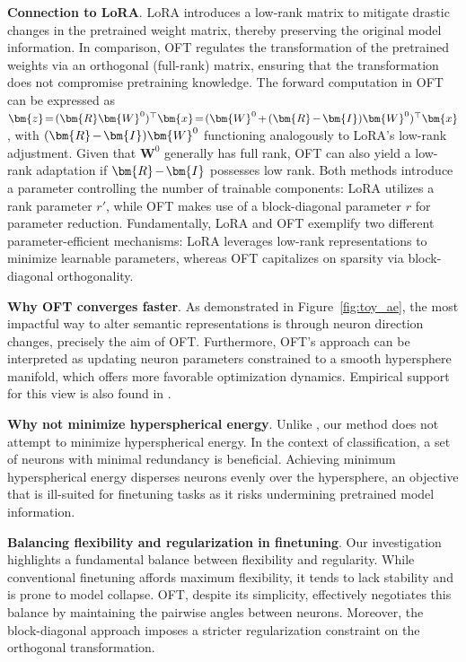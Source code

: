 \textbf{Connection to LoRA}. LoRA introduces a low-rank matrix to mitigate drastic changes in the pretrained weight matrix, thereby preserving the original model information. In comparison, OFT regulates the transformation of the pretrained weights via an orthogonal (full-rank) matrix, ensuring that the transformation does not compromise pretraining knowledge. The forward computation in OFT can be expressed as $\thickmuskip=2mu \medmuskip=2mu \bm{z}=(\bm{R}\bm{W}^0)^\top\bm{x}=(\bm{W}^0+(\bm{R}-\bm{I})\bm{W}^0)^\top\bm{x}$, with $\thickmuskip=2mu \medmuskip=2mu (\bm{R}-\bm{I})\bm{W}^0$ functioning analogously to LoRA’s low-rank adjustment. Given that $\bm{W}^0$ generally has full rank, OFT can also yield a low-rank adaptation if $\thickmuskip=2mu \medmuskip=2mu \bm{R}-\bm{I}$ possesses low rank. Both methods introduce a parameter controlling the number of trainable components: LoRA utilizes a rank parameter $r'$, while OFT makes use of a block-diagonal parameter $r$ for parameter reduction. Fundamentally, LoRA and OFT exemplify two different parameter-efficient mechanisms: LoRA leverages low-rank representations to minimize learnable parameters, whereas OFT capitalizes on sparsity via block-diagonal orthogonality.

\textbf{Why OFT converges faster}. As demonstrated in Figure~\ref{fig:toy_ae}, the most impactful way to alter semantic representations is through neuron direction changes, precisely the aim of OFT. Furthermore, OFT's approach can be interpreted as updating neuron parameters constrained to a smooth hypersphere manifold, which offers more favorable optimization dynamics. Empirical support for this view is also found in \cite{liu2021orthogonal}.

\textbf{Why not minimize hyperspherical energy}. Unlike \cite{liu2021orthogonal}, our method does not attempt to minimize hyperspherical energy. In the context of classification, a set of neurons with minimal redundancy is beneficial. Achieving minimum hyperspherical energy disperses neurons evenly over the hypersphere, an objective that is ill-suited for finetuning tasks as it risks undermining pretrained model information.

\textbf{Balancing flexibility and regularization in finetuning}. Our investigation highlights a fundamental balance between flexibility and regularity. While conventional finetuning affords maximum flexibility, it tends to lack stability and is prone to model collapse. OFT, despite its simplicity, effectively negotiates this balance by maintaining the pairwise angles between neurons. Moreover, the block-diagonal approach imposes a stricter regularization constraint on the orthogonal transformation.

